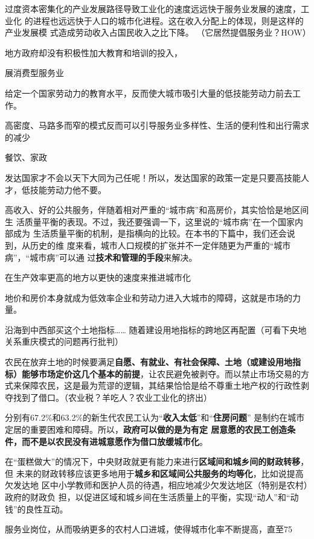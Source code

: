过度资本密集化的产业发展路径导致工业化的速度远远快于服务业发展的速度，工业化
的进程也远远快于人口的城市化进程。这在收入分配上的体现，则是这样的产业发展模
式造成劳动收入占国民收入之比下降。 （它居然提倡服务业？HOW）

地方政府却没有积极性加大教育和培训的投入，

展消费型服务业

给定一个国家劳动力的教育水平，反而使大城市吸引大量的低技能劳动力前去工作。

高密度、马路多而窄的模式反而可以引导服务业多样性、生活的便利性和出行需求的减少

餐饮、家政

发达国家才不会以天下大同为己任呢！所以，发达国家的政策一定是只要高技能人才，低技能劳动力他不要。

高收入、好的公共服务，伴随着相对严重的“城市病”和高房价，其实恰恰是地区间生
活质量平衡的表现。不过，我还要强调一下，这里说的“城市病”在一个国家内部成为
生活质量平衡的机制，是指横向的比较。在本书的下篇中，我们还会说到，从历史的维
度来看，城市人口规模的扩张并不一定伴随更为严重的“城市病”，“城市病”可以通
过{\bf 技术和管理的手段}来解决。

在生产效率更高的地方以更快的速度来推进城市化

地价和房价本身就成为低效率企业和劳动力进入大城市的障碍，这就是市场的力量。

沿海到中西部买这个土地指标…… 随着建设用地指标的跨地区再配置（可看下央地关系重庆模式的问题再行批判）

农民在放弃土地的时候要满足{\bf 自愿、有就业、有社会保障、土地（或建设用地指标）能够市场定价这几个基本的前提}，让农民避免被剥夺。而以禁止市场交易的方式来保障农民，这是最为荒谬的逻辑，其结果恰恰是给不尊重土地产权的行政性剥夺找到了借口。（农业税？羊吃人？农业工业化的挤出）

分别有67.2\%和63.2\%的新生代农民工认为“{\bf 收入太低}”和“{\bf 住房问题}”
          是制约在城市定居的重要困难和障碍。所以，{\bf 政府可以做的是为有定
          居意愿的农民工创造条件，而不是以农民没有进城意愿作为借口放缓城市化}。

在“蛋糕做大”的情况下，中央财政就更有能力来进行{\bf 区域间和城乡间的财政转移}，但
未来的财政转移应该更多地用于{\bf 城乡和区域间公共服务的均等化}，比如说提高欠发达地
区中小学教师和医护人员的待遇，相应地减少欠发达地区（特别是农村）政府的财政负
担，以促进区域和城乡间在生活质量上的平衡，实现“动人”和“动钱”的良性互动。

服务业岗位，从而吸纳更多的农村人口进城，使得城市化率不断提高，直至75%


